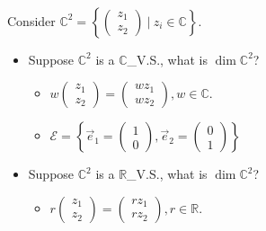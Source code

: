 \documentclass[11pt,fleqn]{book} %
\begin{document}
\begin{example}
{~~~}

    Consider $\mathbb{C}^2 = \left\{ \begin{pmatrix} z_1\\z_2 \end{pmatrix} ~|~ z_i \in \mathbb{C} \right\}$.

    \begin{itemize}
        \item Suppose $\mathbb{C}^2$ is a $\mathbb{C}$\_V.S., what is $\dim \mathbb{C}^2$?

        \begin{itemize}
            \item $w\begin{pmatrix} z_1\\z_2 \end{pmatrix} = \begin{pmatrix} wz_1 \\ wz_2\end{pmatrix}, w\in \mathbb{C}$.

            \item $\mathcal{E} = \left\{ \vec{e}_1 = \begin{pmatrix} 1\\0 \end{pmatrix}, \vec{e}_2=\begin{pmatrix} 0\\1 \end{pmatrix} \right\}$
        \end{itemize}

        \item Suppose $\mathbb{C}^2$ is a $\mathbb{R}$\_V.S., what is $\dim \mathbb{C}^2$?

        \begin{itemize}
            \item $r \begin{pmatrix} z_1\\z_2 \end{pmatrix} = \begin{pmatrix} rz_1 \\ rz_2\end{pmatrix}, r \in \mathbb{R}$.


\end{itemize}
\end{itemize}
\end{example}
\end{document}
